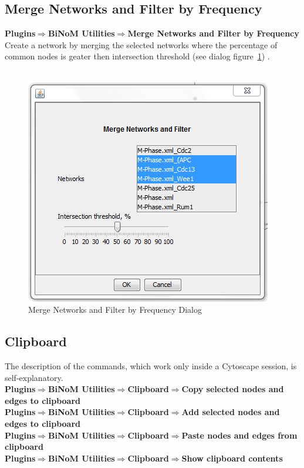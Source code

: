 \subsection{Merge Networks and Filter by Frequency}
\textbf{Plugins$\Rightarrow$BiNoM Utilities$\Rightarrow$Merge Networks and Filter by Frequency}\\
Create a network by merging the selected networks where the percentage of common nodes is geater then intersection threshold (see dialog figure~\ref{Merge_Networks_and_Filter}) .\\\\
\begin{figure}[h]
\centering
\includegraphics{graphics/Merge_Networks_and_Filter}
\caption{Merge Networks and Filter by Frequency Dialog}
\label{Merge_Networks_and_Filter}
\end{figure}

\subsection{Clipboard}
The description of the commands, which work only inside a Cytoscape session, is self-explanatory.\\
\textbf{Plugins$\Rightarrow$BiNoM Utilities$\Rightarrow$Clipboard$\Rightarrow$Copy selected nodes and edges to clipboard}\\
\textbf{Plugins$\Rightarrow$BiNoM Utilities$\Rightarrow$Clipboard$\Rightarrow$Add selected nodes and edges to clipboard}\\
\textbf{Plugins$\Rightarrow$BiNoM Utilities$\Rightarrow$Clipboard$\Rightarrow$Paste nodes and edges from clipboard}\\
\textbf{Plugins$\Rightarrow$BiNoM Utilities$\Rightarrow$Clipboard$\Rightarrow$Show clipboard contents}\\